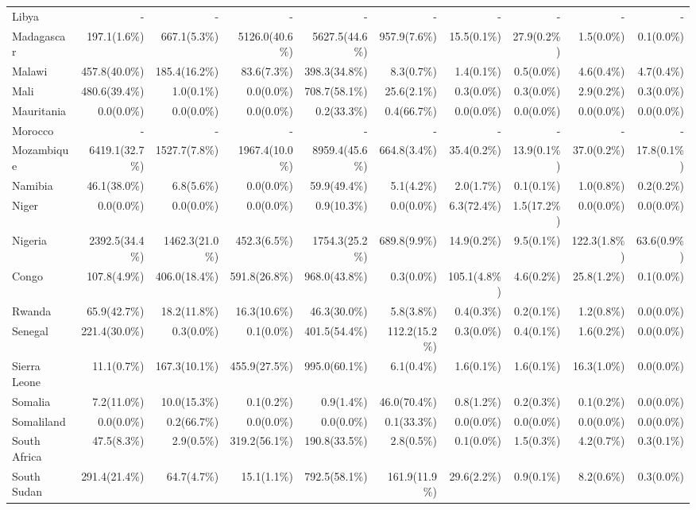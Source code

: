 \begin{scriptsize}
\begin{landscape}
\begin{center}
\begin{longtable}[ht]{lrrrrrrrrr}
			Libya&-&-&-&-&-&-&-&-&-\\
			Madagascar&197.1(1.6\%)&667.1(5.3\%)&5126.0(40.6\%)&5627.5(44.6\%)&957.9(7.6\%)&15.5(0.1\%)&27.9(0.2\%)&1.5(0.0\%)&0.1(0.0\%)\\
			Malawi&457.8(40.0\%)&185.4(16.2\%)&83.6(7.3\%)&398.3(34.8\%)&8.3(0.7\%)&1.4(0.1\%)&0.5(0.0\%)&4.6(0.4\%)&4.7(0.4\%)\\
			Mali&480.6(39.4\%)&1.0(0.1\%)&0.0(0.0\%)&708.7(58.1\%)&25.6(2.1\%)&0.3(0.0\%)&0.3(0.0\%)&2.9(0.2\%)&0.3(0.0\%)\\
			Mauritania&0.0(0.0\%)&0.0(0.0\%)&0.0(0.0\%)&0.2(33.3\%)&0.4(66.7\%)&0.0(0.0\%)&0.0(0.0\%)&0.0(0.0\%)&0.0(0.0\%)\\
			Morocco&-&-&-&-&-&-&-&-&-\\
			Mozambique&6419.1(32.7\%)&1527.7(7.8\%)&1967.4(10.0\%)&8959.4(45.6\%)&664.8(3.4\%)&35.4(0.2\%)&13.9(0.1\%)&37.0(0.2\%)&17.8(0.1\%)\\
			Namibia&46.1(38.0\%)&6.8(5.6\%)&0.0(0.0\%)&59.9(49.4\%)&5.1(4.2\%)&2.0(1.7\%)&0.1(0.1\%)&1.0(0.8\%)&0.2(0.2\%)\\
			Niger&0.0(0.0\%)&0.0(0.0\%)&0.0(0.0\%)&0.9(10.3\%)&0.0(0.0\%)&6.3(72.4\%)&1.5(17.2\%)&0.0(0.0\%)&0.0(0.0\%)\\
			Nigeria&2392.5(34.4\%)&1462.3(21.0\%)&452.3(6.5\%)&1754.3(25.2\%)&689.8(9.9\%)&14.9(0.2\%)&9.5(0.1\%)&122.3(1.8\%)&63.6(0.9\%)\\
			Congo&107.8(4.9\%)&406.0(18.4\%)&591.8(26.8\%)&968.0(43.8\%)&0.3(0.0\%)&105.1(4.8\%)&4.6(0.2\%)&25.8(1.2\%)&0.1(0.0\%)\\
			Rwanda&65.9(42.7\%)&18.2(11.8\%)&16.3(10.6\%)&46.3(30.0\%)&5.8(3.8\%)&0.4(0.3\%)&0.2(0.1\%)&1.2(0.8\%)&0.0(0.0\%)\\
			Senegal&221.4(30.0\%)&0.3(0.0\%)&0.1(0.0\%)&401.5(54.4\%)&112.2(15.2\%)&0.3(0.0\%)&0.4(0.1\%)&1.6(0.2\%)&0.0(0.0\%)\\
			Sierra Leone&11.1(0.7\%)&167.3(10.1\%)&455.9(27.5\%)&995.0(60.1\%)&6.1(0.4\%)&1.6(0.1\%)&1.6(0.1\%)&16.3(1.0\%)&0.0(0.0\%)\\
			Somalia&7.2(11.0\%)&10.0(15.3\%)&0.1(0.2\%)&0.9(1.4\%)&46.0(70.4\%)&0.8(1.2\%)&0.2(0.3\%)&0.1(0.2\%)&0.0(0.0\%)\\
			Somaliland&0.0(0.0\%)&0.2(66.7\%)&0.0(0.0\%)&0.0(0.0\%)&0.1(33.3\%)&0.0(0.0\%)&0.0(0.0\%)&0.0(0.0\%)&0.0(0.0\%)\\
			South Africa&47.5(8.3\%)&2.9(0.5\%)&319.2(56.1\%)&190.8(33.5\%)&2.8(0.5\%)&0.1(0.0\%)&1.5(0.3\%)&4.2(0.7\%)&0.3(0.1\%)\\
			South Sudan&291.4(21.4\%)&64.7(4.7\%)&15.1(1.1\%)&792.5(58.1\%)&161.9(11.9\%)&29.6(2.2\%)&0.9(0.1\%)&8.2(0.6\%)&0.3(0.0\%)\\

\end{longtable}
\end{center}
\end{landscape}
\end{scriptsize}
